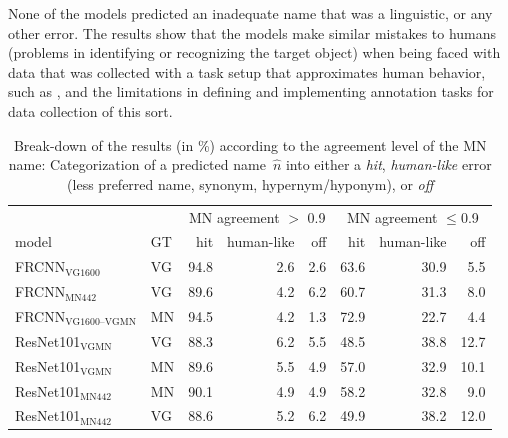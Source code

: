 None of the models predicted an inadequate name that was a linguistic, or any other error. 
The results show that the models make similar mistakes to humans (problems in identifying or recognizing the target object) when being faced with data that was collected with a task setup that approximates human behavior, such as \mn, and the limitations in defining and implementing annotation tasks for data collection of this sort. 


\begin{table}[t]
\centering
	\small
\begin{tabular}{ll|rrr|rrr}
\toprule
&  & \multicolumn{3}{c|}{MN agreement $>$ 0.9} & \multicolumn{3}{c}{MN agreement $\leq$0.9}\\
                         model &  GT &  hit &  human-like &  off &  hit &  human-like &  off \\
\midrule
       FRCNN$_{\text{VG1600}}$ &  VG &   94.8 &           2.6 &      2.6 &   63.6 &          30.9 &      5.5 \\
        FRCNN$_{\text{MN442}}$ &  VG &   89.6 &           4.2 &      6.2 &   60.7 &          31.3 &      8.0 \\
        \midrule
 FRCNN$_{\text{VG1600--VGMN}}$ &  MN &   94.5 &           4.2 &      1.3 &   72.9 &          22.7 &      4.4 \\
 \midrule
     ResNet101$_{\text{VGMN}}$ &  VG &   88.3 &           6.2 &      5.5 &   48.5 &          38.8 &     12.7 \\
     ResNet101$_{\text{VGMN}}$ &  MN &   89.6 &           5.5 &      4.9 &   57.0 &          32.9 &     10.1 \\
    ResNet101$_{\text{MN442}}$ &  MN &   90.1 &           4.9 &      4.9 &   58.2 &          32.8 &      9.0 \\
    ResNet101$_{\text{MN442}}$ &  VG &   88.6 &           5.2 &      6.2 &   49.9 &          38.2 &     12.0 \\
\bottomrule
\end{tabular}
\caption{Break-down of the results (in \%) according to the agreement level of the MN name: Categorization of a predicted name\ $\hat{n}$ into either a \textit{hit}, \textit{human-like} error (less preferred name, synonym, hypernym/hyponym), or \textit{off} \label{tab:exp_errors_agreement}}
\end{table}

